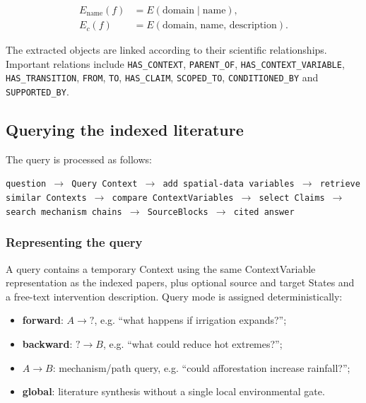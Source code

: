 \documentclass[10pt,twocolumn]{article}
\begin{document}
\begin{align}
E_{\mathrm{name}}(f) &= E(\text{domain} \; | \; \text{name}),\\
E_c(f) &= E(\text{domain, name, description}).
\end{align}

The extracted objects are linked according to their scientific relationships. Important relations include \texttt{HAS\_CONTEXT}, \texttt{PARENT\_OF}, \texttt{HAS\_CONTEXT\_VARIABLE}, \texttt{HAS\_TRANSITION}, \texttt{FROM}, \texttt{TO}, \texttt{HAS\_CLAIM}, \texttt{SCOPED\_TO}, \texttt{CONDITIONED\_BY} and \texttt{SUPPORTED\_BY}.

\subsection{Querying the indexed literature}
\label{sec:querying}

The query is processed as follows:

\begin{center}
\small
\texttt{question $\rightarrow$ Query Context $\rightarrow$ add spatial-data variables $\rightarrow$ retrieve similar Contexts $\rightarrow$ compare ContextVariables $\rightarrow$ select Claims $\rightarrow$ search mechanism chains $\rightarrow$ SourceBlocks $\rightarrow$ cited answer}
\end{center}

\subsubsection{Representing the query}

A query contains a temporary Context using the same ContextVariable representation as the indexed papers, plus optional source and target States and a free-text intervention description. Query mode is assigned deterministically:

\begin{itemize}
  \item \textbf{forward}: $A \rightarrow ?$, e.g. ``what happens if irrigation expands?'';
  \item \textbf{backward}: $? \rightarrow B$, e.g. ``what could reduce hot extremes?'';
  \item \textbf{$A\rightarrow B$}: mechanism/path query, e.g. ``could afforestation increase rainfall?'';
  \item \textbf{global}: literature synthesis without a single local environmental gate.
\end{itemize}
\end{document}
